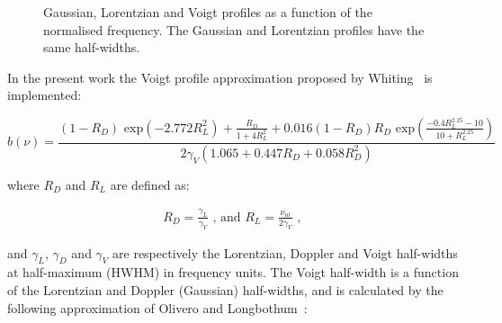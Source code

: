 \par

\begin{figure}[h]
 \centering
 \caption{Gaussian, Lorentzian and Voigt profiles as a function of the normalised frequency.  The Gaussian and Lorentzian profiles have the same half-widths.}
 \label{fig:voigt-profile}
\end{figure}

In the present work the Voigt profile approximation proposed by Whiting~\cite{Whi68} is implemented:

\begin{equation}
 b(\nu) = \frac{\left ( 1 - R_D \right ) \text{~exp} \left ( -2.772 R_L^2 \right ) + \frac{R_D}{1 + 4 R_L^2} + 0.016 ( 1- R_D ) R_D \text{~exp} \left ( \frac{-0.4 R_L^{2.25} - 10}{10 + R_L^{2.25}} \right )}{2 \gamma_V \left ( 1.065 + 0.447 R_D + 0.058 R_D^2 \right )}
\end{equation}

\noindent where $R_D$ and $R_L$ are defined as:

\begin{eqnarray}
 R_D = \frac{\gamma_L}{\gamma_V} \text{ , and }
 R_L  = \frac{\nu_{ul}}{2 \gamma_V} \text{ , }
\end{eqnarray}

\noindent and $\gamma_L$, $\gamma_D$ and $\gamma_V$ are respectively the Lorentzian, Doppler and Voigt half-widths at half-maximum (HWHM) in frequency units.
The Voigt half-width is a function of the Lorentzian and Doppler (Gaussian) half-widths, and is calculated by the following approximation of Olivero and Longbothum~\cite{olivero}:

